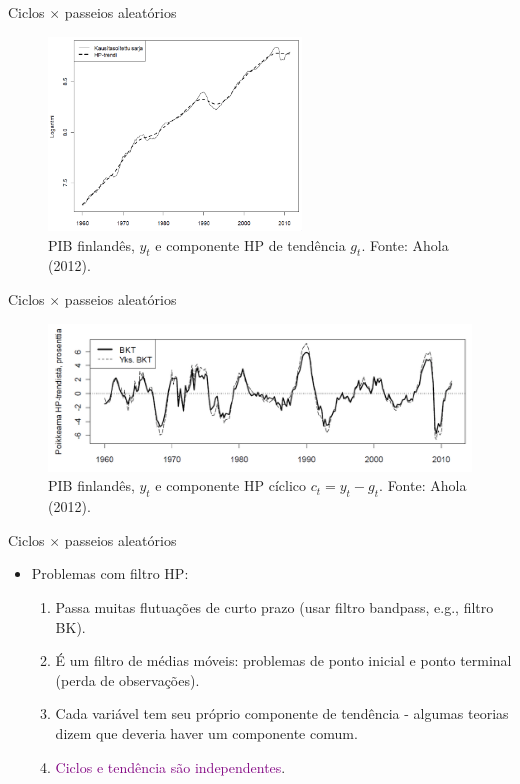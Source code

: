 \documentclass[10pt]{beamer}
\begin{document}
\begin{frame}{Ciclos $\times$ passeios aleatórios}
    \begin{figure}
        \centering
        \includegraphics[width=0.6\textwidth]{./figures/aula14_fig1.PNG}
        \caption{PIB finlandês, $y_t$ e componente HP de tendência $g_t$. Fonte: Ahola (2012).}
        \label{fig1}
    \end{figure}
\end{frame}

\begin{frame}{Ciclos $\times$ passeios aleatórios}
    \begin{figure}
        \centering
        \includegraphics[width=\textwidth]{./figures/aula14_fig2.PNG}
        \caption{PIB finlandês, $y_t$ e componente HP cíclico $c_t = y_t - g_t$. Fonte: Ahola (2012).}
        \label{fig2}
    \end{figure}
\end{frame}

\begin{frame}{Ciclos $\times$ passeios aleatórios}
    \begin{itemize}
        \item Problemas com filtro HP:
        \begin{enumerate}
            \item Passa muitas flutuações de curto prazo (usar filtro bandpass, e.g., filtro BK).
            \bigskip
            \item É um filtro de médias móveis: problemas de ponto inicial e ponto terminal (perda de observações).
            \bigskip
            \item Cada variável tem seu próprio componente de tendência - algumas teorias dizem que deveria haver um componente comum.
            \bigskip
            \item \textcolor{purple}{Ciclos e tendência são independentes}.
        \end{enumerate}
    \end{itemize}
\end{frame}
\end{document}
